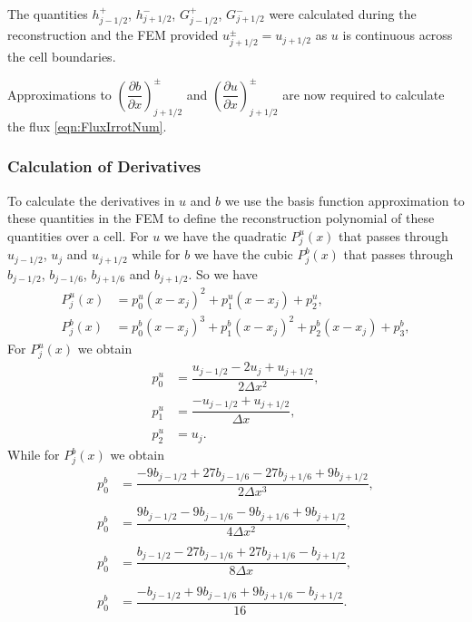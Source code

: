 The quantities $h^+_{j - 1/2}$, $h^-_{j + 1/2}$, $G^+_{j - 1/2}$, $G^-_{j + 1/2}$ were calculated during the reconstruction and the FEM provided $u^\pm_{j+1/2} = u_{j+1/2}$ as $u$ is continuous across the cell boundaries.

Approximations to $\left(\dfrac{\partial {b}}{\partial x} \right)^\pm_{j + 1/2}$ and $\left(\dfrac{\partial {u}}{\partial x} \right)^\pm_{j + 1/2}$ are now required to calculate the flux \eqref{eqn:FluxIrrotNum}. 

\subsubsection{Calculation of Derivatives}
To calculate the derivatives in $u$ and $b$ we use the basis function approximation to these quantities in the FEM to define the reconstruction polynomial of these quantities over a cell. For $u$ we have the quadratic $P_j^u(x)$ that passes through $u_{j-1/2}$, $u_j$ and $u_{j+1/2}$ while for $b$ we have the cubic $P_j^b(x)$ that passes through $b_{j-1/2}$, $b_{j-1/6}$, $b_{j+1/6}$ and $b_{j+1/2}$. So we have 
\begin{subequations}
	\begin{align}
	P^u_j(x) &= p^u_0 \left(x - x_j\right)^2 + p^u_1 \left(x - x_j\right) + p^u_2, \\
	P^b_j(x) &= p^b_0 \left(x - x_j\right)^3 + p^b_1 \left(x - x_j\right)^2 + p^b_2 \left(x - x_j\right)  + p^b_3,
	\end{align}
	\label{eqn:Polyforuandbcell}
\end{subequations}
For $P^u_j(x)$ we obtain
\begin{align*}
p^u_0 &=  \dfrac{u_{j-1/2} - 2u_j + u_{j+1/2}}{2 \Delta x^2},\\
p^u_1 &=  \dfrac{-u_{j-1/2} + u_{j+1/2}}{\Delta x},\\
p^u_2 &=  u_j.
\end{align*}
While for $P^b_j(x)$ we obtain
\begin{align*}
p^b_0 &=  \dfrac{-9b_{j-1/2} + 27b_{j-1/6} - 27 b_{j+1/6} + 9b_{j+1/2}}{2 \Delta x^3},\\ \\
p^b_0 &=  \dfrac{9b_{j-1/2} - 9b_{j-1/6} - 9b_{j+1/6} + 9b_{j+1/2}}{4 \Delta x^2},\\ \\ 
p^b_0 &=  \dfrac{b_{j-1/2} - 27b_{j-1/6} + 27 b_{j+1/6} - b_{j+1/2}}{8 \Delta x},\\\\
p^b_0 &=  \dfrac{-b_{j-1/2}  + 9b_{j-1/6} + 9 b_{j+1/6} - b_{j+1/2}}{16}.
\end{align*}
